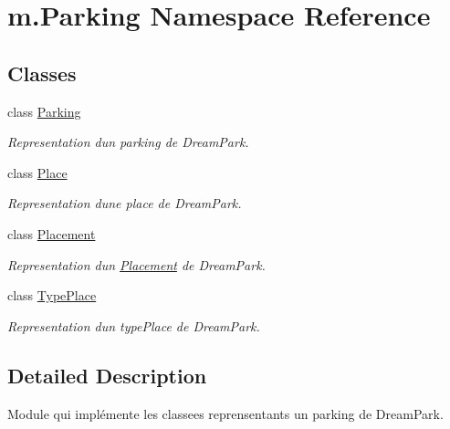 \hypertarget{namespacem_1_1_parking}{}\section{m.\+Parking Namespace Reference}
\label{namespacem_1_1_parking}
\subsection*{Classes}
\begin{DoxyCompactItemize}
\item 
class \hyperlink{classm_1_1_parking_1_1_parking}{Parking}
\begin{DoxyCompactList}\small\item\em Representation d\textquotesingle{}un parking de Dream\+Park. \end{DoxyCompactList}\item 
class \hyperlink{classm_1_1_parking_1_1_place}{Place}
\begin{DoxyCompactList}\small\item\em Representation d\textquotesingle{}une place de Dream\+Park. \end{DoxyCompactList}\item 
class \hyperlink{classm_1_1_parking_1_1_placement}{Placement}
\begin{DoxyCompactList}\small\item\em Representation d\textquotesingle{}un \hyperlink{classm_1_1_parking_1_1_placement}{Placement} de Dream\+Park. \end{DoxyCompactList}\item 
class \hyperlink{classm_1_1_parking_1_1_type_place}{Type\+Place}
\begin{DoxyCompactList}\small\item\em Representation d\textquotesingle{}un type\+Place de Dream\+Park. \end{DoxyCompactList}\end{DoxyCompactItemize}


\subsection{Detailed Description}
\begin{DoxyVerb}    Module qui implémente les classees reprensentants un parking de DreamPark.
\end{DoxyVerb}
 
